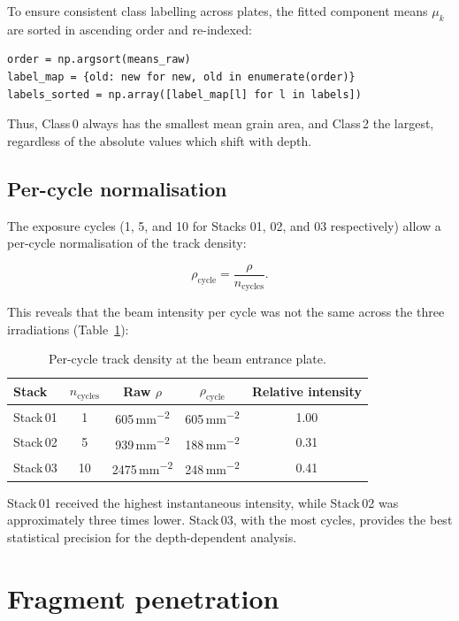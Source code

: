 \documentclass[12pt,a4paper]{article}
\begin{document}
To ensure consistent class labelling across plates, the fitted
component means $\mu_k$ are sorted in ascending order and re-indexed:

\begin{verbatim}
order = np.argsort(means_raw)
label_map = {old: new for new, old in enumerate(order)}
labels_sorted = np.array([label_map[l] for l in labels])
\end{verbatim}

Thus, Class\,0 always has the smallest mean grain area, and Class\,2
the largest, regardless of the absolute values which shift with depth.

\subsection{Per-cycle normalisation}

The exposure cycles (1, 5, and 10 for Stacks 01, 02, and 03
respectively) allow a per-cycle normalisation of the track density:

\[
\rho_{\text{cycle}} = \frac{\rho}{n_{\text{cycles}}}.
\]

This reveals that the beam intensity per cycle was not the same across
the three irradiations (Table~\ref{tab:cycle}):

\begin{table}[H]
\centering
\caption{Per-cycle track density at the beam entrance plate.}
\label{tab:cycle}
\begin{tabular}{lcccc}
\toprule
Stack & $n_{\text{cycles}}$ & Raw $\rho$ & $\rho_{\text{cycle}}$ &
Relative intensity \\
\midrule
Stack\,01 & 1  & 605\,\si{\mm^{-2}} & 605\,\si{\mm^{-2}} & 1.00 \\
Stack\,02 & 5  & 939\,\si{\mm^{-2}} & 188\,\si{\mm^{-2}} & 0.31 \\
Stack\,03 & 10 & 2475\,\si{\mm^{-2}} & 248\,\si{\mm^{-2}} & 0.41 \\
\bottomrule
\end{tabular}
\end{table}

Stack\,01 received the highest instantaneous intensity, while
Stack\,02 was approximately three times lower. Stack\,03, with the
most cycles, provides the best statistical precision for the
depth-dependent analysis.

\section{Fragment penetration}
\label{sec:results}
\end{document}
